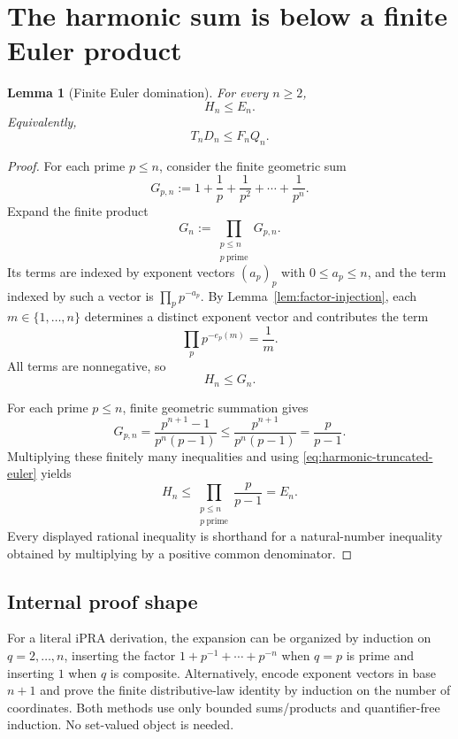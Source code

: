 \documentclass[11pt]{article}
\newtheorem{lemma}[theorem]{Lemma}
\theoremstyle{definition}
\newcommand{\ipra}{\mathrm{iPRA}}
\newcommand{\ProdP}{Q}
\newcommand{\DenE}{D}
\newcommand{\Fact}{F}
\newcommand{\NumH}{T}
\begin{document}
\section{The harmonic sum is below a finite Euler product}

\begin{lemma}[Finite Euler domination]\label{lem:euler-domination}
For every \(n\geq 2\),
\[
  H_n\leq E_n.
\]
Equivalently,
\[
  \NumH_n\DenE_n\leq \Fact_n\ProdP_n.
\]
\end{lemma}

\begin{proof}
For each prime \(p\leq n\), consider the finite geometric sum
\[
  G_{p,n}:=1+\frac1p+\frac1{p^2}+\cdots+\frac1{p^n}.
\]
Expand the finite product
\[
  G_n:=\prod_{\substack{p\leq n\\p\ \mathrm{prime}}}G_{p,n}.
\]
Its terms are indexed by exponent vectors \((a_p)_p\) with
\(0\leq a_p\leq n\), and the term indexed by such a vector is
\(\prod_p p^{-a_p}\).  By Lemma~\ref{lem:factor-injection}, each
\(m\in\{1,\ldots,n\}\) determines a distinct exponent vector and contributes
the term
\[
  \prod_p p^{-e_p(m)}=\frac1m.
\]
All terms are nonnegative, so
\begin{equation}\label{eq:harmonic-truncated-euler}
  H_n\leq G_n.
\end{equation}

For each prime \(p\leq n\), finite geometric summation gives
\[
 G_{p,n}
 =\frac{p^{n+1}-1}{p^n(p-1)}
 \leq\frac{p^{n+1}}{p^n(p-1)}
 =\frac{p}{p-1}.
\]
Multiplying these finitely many inequalities and using
\eqref{eq:harmonic-truncated-euler} yields
\[
  H_n\leq
  \prod_{\substack{p\leq n\\p\ \mathrm{prime}}}\frac{p}{p-1}
  =E_n.
\]
Every displayed rational inequality is shorthand for a natural-number
inequality obtained by multiplying by a positive common denominator.
\end{proof}

\subsection{Internal proof shape}

For a literal \(\ipra\) derivation, the expansion can be organized by
induction on \(q=2,\ldots,n\), inserting the factor
\(1+p^{-1}+\cdots+p^{-n}\) when \(q=p\) is prime and inserting \(1\) when
\(q\) is composite.  Alternatively, encode exponent vectors in base
\(n+1\) and prove the finite distributive-law identity by induction on the
number of coordinates.  Both methods use only bounded sums/products and
quantifier-free induction.  No set-valued object is needed.
\end{document}
